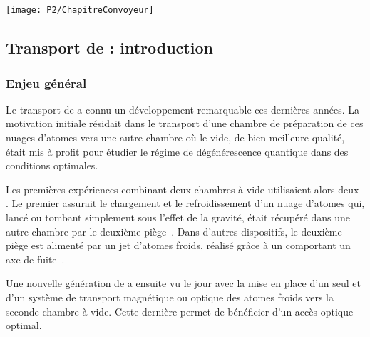 \chapter{\TitreChapitreQuatre}\label{chap:Convoyeur}

\bfigh
\texttt{[image: P2/ChapitreConvoyeur]}
\SansCaption
\efigh

\pagebreak
{}

\minitoc
\vspace{0.5cm}

\section{Transport de \patufs : introduction}\label{sec:ConvIntro}

\subsection{Enjeu général}
Le transport de \patufs a connu un développement remarquable ces dernières années. La motivation initiale résidait dans le transport d'une chambre de préparation de ces nuages d'atomes vers une autre chambre où le vide, de bien meilleure qualité, était mis à profit pour étudier le régime de dégénérescence quantique dans des conditions optimales.

Les premières expériences combinant deux chambres à vide utilisaient alors deux \pmos. Le premier assurait le chargement et le refroidissement d'un nuage d'atomes qui, lancé ou tombant simplement sous l'effet de la gravité, était récupéré dans une autre chambre par le deuxième piège~\cite{CMW91}. Dans d'autres dispositifs, le deuxième piège est alimenté par un jet d'atomes froids, réalisé grâce à un \pmo comportant un axe de fuite~\cite{LCR96, DSW98}. 

Une nouvelle génération de \setups a ensuite vu le jour avec la mise en place d'un seul \pmo et d'un système de transport magnétique ou optique des atomes froids vers la seconde chambre à vide. Cette dernière permet de bénéficier d'un accès optique optimal. 

\casse

